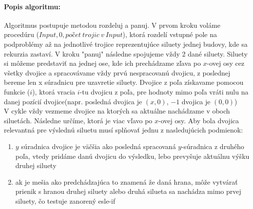 \documentclass[12pt]{iv003}
\begin{document}
\paragraph{Popis algoritmu:} Algoritmus postupuje metodou rozdeluj a panuj. V prvom kroku voláme procedúru \ffcomputesiluete($Input, 0, počet\ trojic\ v\ Input$), ktorá rozdelí vstupné pole na podproblémy až na jednotlivé trojice reprezentujúce siluety jednej budovy, kde sa rekurzia zastaví. V kroku "panuj" následne spojujeme vždy 2 dané siluety. Siluety si môžeme predstaviť na jednej ose, kde ich prechádzame zľava po $x$-ovej osy cez všetky dvojice a spracovávame vždy prvú nespracovanú dvojicu, z poslednej bereme len x súradnicu pre uzavretie siluety. Dvojice z poľa získavame pomocou funkcie \fftakePair($i$), ktorá vracia $i$-tu dvojicu z poľa, pre hodnoty mimo poľa vráti nulu na danej pozícií dvojice(napr. posledná dvojica je $(x,0)$, $-1$ dvojica je $(0,0)$)\\
V cykle vždy vezmeme dvojice na ktorých sa aktuálne nachádzame v oboch siluetách. Následne určíme, ktorá je viac vľavo po $x$-ovej osy. Aby bola dvojica relevantná pre výslednú siluetu musí splňovať jednu z nasledujúcich podmienok:
\begin{enumerate}
	\item $y$ súradnica dvojice je väčšia ako posledná spracovaná $y$-súradnica z druhého poľa, vtedy pridáme danú dvojicu do výsledku, lebo prevyšuje aktuálnu výšku druhej siluety
	\item ak je mešia ako predchádzajúca to znamená že daná hrana, môže vytvárať prienik s hranou druhej siluety alebo druhá silueta sa nachádza mimo prvej siluety, čo testuje zanorený esle-if 
\end{enumerate}
\end{document}
